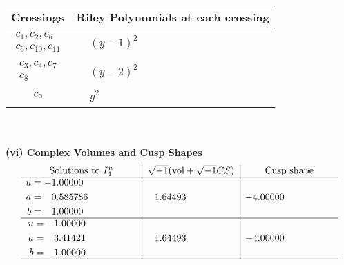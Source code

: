 \documentclass[1p]{elsarticle_modified}
\theoremstyle{definition}
\newcommand{\I}{\sqrt{-1}}
\begin{document}
\begin{tabular}{m{50pt}|m{274pt}}
Crossings & \hspace{64pt}Riley Polynomials at each crossing \\
\hline $$\begin{aligned}c_{1},c_{2},c_{5}\\c_{6},c_{10},c_{11}\end{aligned}$$&$\begin{aligned}
&(y-1)^2
\end{aligned}$\\
\hline $$\begin{aligned}c_{3},c_{4},c_{7}\\c_{8}\end{aligned}$$&$\begin{aligned}
&(y-2)^2
\end{aligned}$\\
\hline $$\begin{aligned}c_{9}\end{aligned}$$&$\begin{aligned}
&y^2
\end{aligned}$\\
\hline
\end{tabular}\\~\\
\newpage\flushleft \textbf{(vi) Complex Volumes and Cusp Shapes}
$$\begin{array}{c|c|c}  
\text{Solutions to }I^u_{4}& \I (\text{vol} + \sqrt{-1}CS) & \text{Cusp shape}\\
 \hline 
\begin{aligned}
u &= -1.00000\phantom{ +0.000000I} \\
a &= \phantom{-}0.585786\phantom{ +0.000000I} \\
b &= \phantom{-}1.00000\phantom{ +0.000000I}\end{aligned}
 & \phantom{-}1.64493\phantom{ +0.000000I} & -4.00000\phantom{ +0.000000I} \\ \hline\begin{aligned}
u &= -1.00000\phantom{ +0.000000I} \\
a &= \phantom{-}3.41421\phantom{ +0.000000I} \\
b &= \phantom{-}1.00000\phantom{ +0.000000I}\end{aligned}
 & \phantom{-}1.64493\phantom{ +0.000000I} & -4.00000\phantom{ +0.000000I}\\
 \hline 
 \end{array}$$\newpage
\newpage\renewcommand{\arraystretch}{1}
\end{document}
